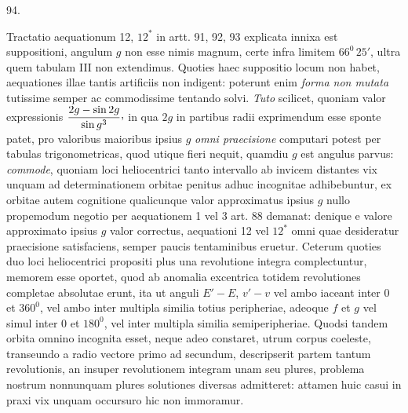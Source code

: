 \par{}\medskip
\hypertarget{native-127-article094}{}
\begin{center}94.\end{center}
Tractatio aequationum 12, $12^{\ast}$ in artt. 91, 92, 93 explicata innixa est suppositioni, angulum $g$ non esse nimis magnum, certe infra limitem $66^0\,25'$, ultra quem tabulam III non extendimus. Quoties haec suppositio locum non habet, aequationes illae tantis artificiis non indigent: poterunt enim \textit{forma non mutata} tutissime semper ac commodissime tentando solvi. \textit{Tuto} scilicet, quoniam valor expressionis $\dfrac{2g-\sin 2g}{\sin g^3}\mathpunct{\raisebox{.45ex}{,}}$ in qua $2g$ in partibus radii exprimendum esse sponte patet, pro valoribus maioribus ipsius $g$ \textit{omni praecisione} computari potest per tabulas trigonometricas, quod utique fieri nequit, quamdiu $g$ est angulus parvus: \textit{commode}, quoniam loci heliocentrici tanto intervallo ab invicem distantes vix unquam ad determinationem orbitae penitus adhuc incognitae adhibebuntur, ex orbitae autem cognitione qualicunque valor approximatus ipsius $g$ nullo propemodum negotio per aequationem 1 vel 3 art. 88 demanat: denique e valore approximato ipsius $g$ valor correctus, aequationi 12 vel $12^{\ast}$ omni quae desideratur praecisione satisfaciens, semper paucis tentaminibus eruetur. Ceterum quoties duo loci heliocentrici propositi plus una revolutione integra complectuntur, memorem esse oportet, quod ab anomalia excentrica totidem revolutiones completae absolutae erunt, ita ut anguli $E'-E$, $v'-v$ vel ambo iaceant inter 0 et $360^0$, vel ambo inter multipla similia totius peripheriae, adeoque $f$ et $g$ vel simul inter 0 et $180^0$, vel inter multipla similia semiperipheriae. Quodsi tandem orbita omnino incognita esset, neque adeo constaret, utrum corpus coeleste, transeundo a radio vectore primo ad secundum, descripserit partem tantum revolutionis, an insuper revolutionem integram unam seu plures, problema nostrum nonnunquam plures solutiones diversas admitteret: attamen huic casui in praxi vix unquam occursuro hic non immoramur.
